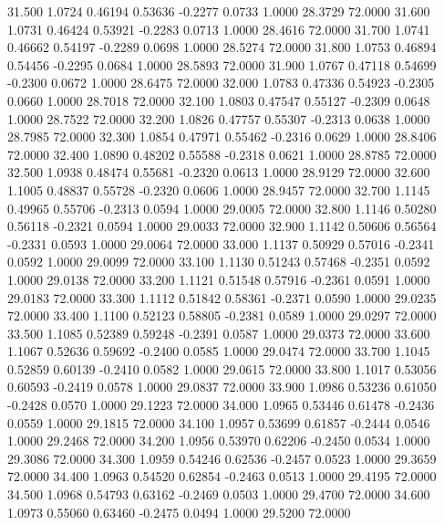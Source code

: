  31.500   1.0724   0.46194   0.53636  -0.2277   0.0733   1.0000  28.3729  72.0000
  31.600   1.0731   0.46424   0.53921  -0.2283   0.0713   1.0000  28.4616  72.0000
  31.700   1.0741   0.46662   0.54197  -0.2289   0.0698   1.0000  28.5274  72.0000
  31.800   1.0753   0.46894   0.54456  -0.2295   0.0684   1.0000  28.5893  72.0000
  31.900   1.0767   0.47118   0.54699  -0.2300   0.0672   1.0000  28.6475  72.0000
  32.000   1.0783   0.47336   0.54923  -0.2305   0.0660   1.0000  28.7018  72.0000
  32.100   1.0803   0.47547   0.55127  -0.2309   0.0648   1.0000  28.7522  72.0000
  32.200   1.0826   0.47757   0.55307  -0.2313   0.0638   1.0000  28.7985  72.0000
  32.300   1.0854   0.47971   0.55462  -0.2316   0.0629   1.0000  28.8406  72.0000
  32.400   1.0890   0.48202   0.55588  -0.2318   0.0621   1.0000  28.8785  72.0000
  32.500   1.0938   0.48474   0.55681  -0.2320   0.0613   1.0000  28.9129  72.0000
  32.600   1.1005   0.48837   0.55728  -0.2320   0.0606   1.0000  28.9457  72.0000
  32.700   1.1145   0.49965   0.55706  -0.2313   0.0594   1.0000  29.0005  72.0000
  32.800   1.1146   0.50280   0.56118  -0.2321   0.0594   1.0000  29.0033  72.0000
  32.900   1.1142   0.50606   0.56564  -0.2331   0.0593   1.0000  29.0064  72.0000
  33.000   1.1137   0.50929   0.57016  -0.2341   0.0592   1.0000  29.0099  72.0000
  33.100   1.1130   0.51243   0.57468  -0.2351   0.0592   1.0000  29.0138  72.0000
  33.200   1.1121   0.51548   0.57916  -0.2361   0.0591   1.0000  29.0183  72.0000
  33.300   1.1112   0.51842   0.58361  -0.2371   0.0590   1.0000  29.0235  72.0000
  33.400   1.1100   0.52123   0.58805  -0.2381   0.0589   1.0000  29.0297  72.0000
  33.500   1.1085   0.52389   0.59248  -0.2391   0.0587   1.0000  29.0373  72.0000
  33.600   1.1067   0.52636   0.59692  -0.2400   0.0585   1.0000  29.0474  72.0000
  33.700   1.1045   0.52859   0.60139  -0.2410   0.0582   1.0000  29.0615  72.0000
  33.800   1.1017   0.53056   0.60593  -0.2419   0.0578   1.0000  29.0837  72.0000
  33.900   1.0986   0.53236   0.61050  -0.2428   0.0570   1.0000  29.1223  72.0000
  34.000   1.0965   0.53446   0.61478  -0.2436   0.0559   1.0000  29.1815  72.0000
  34.100   1.0957   0.53699   0.61857  -0.2444   0.0546   1.0000  29.2468  72.0000
  34.200   1.0956   0.53970   0.62206  -0.2450   0.0534   1.0000  29.3086  72.0000
  34.300   1.0959   0.54246   0.62536  -0.2457   0.0523   1.0000  29.3659  72.0000
  34.400   1.0963   0.54520   0.62854  -0.2463   0.0513   1.0000  29.4195  72.0000
  34.500   1.0968   0.54793   0.63162  -0.2469   0.0503   1.0000  29.4700  72.0000
  34.600   1.0973   0.55060   0.63460  -0.2475   0.0494   1.0000  29.5200  72.0000
